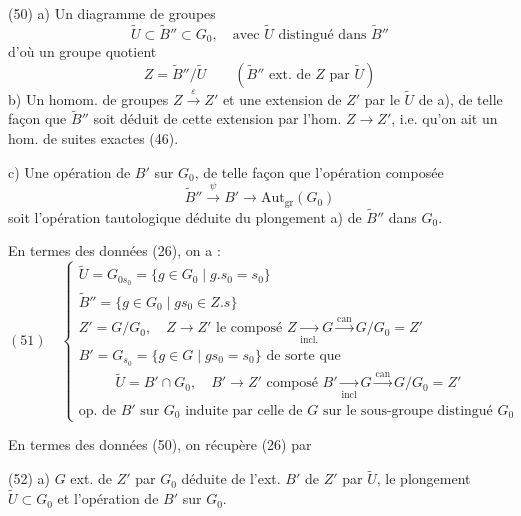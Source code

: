 \documentclass[11pt,a4paper]{article}
\begin{document}
(50) a) Un diagramme de groupes
\[
\tilde{U}\subset\tilde{B}''\subset G_0,\quad\text{avec } \tilde{U} \text{ distingué dans } \tilde{B}''
\]
\struck{\ill{}} d'où un groupe quotient
\[
Z=\tilde{B}''/\tilde{U}\qquad(\tilde{B}'' \text{ ext. de } Z \text{ par } \tilde{U})
\]
b) Un  homom. de groupes $Z\xrightarrow{\ \varepsilon\ }Z'$ et une extension  de $Z'$ par le $\tilde{U}$ de a), de telle façon que $\tilde{B}''$ soit déduit de cette extension par l'hom. $Z\to Z'$, i.e. qu'on ait un hom. de suites exactes (46).

c) Une opération de $B'$ sur $G_0$, de telle façon que l'opération composée
\[
\tilde{B}''\xrightarrow{\ \psi\ }B'\longrightarrow\mathrm{Aut}_{\mathrm{gr}}(G_0)
\]
soit l'opération tautologique déduite du plongement a) de $\tilde{B}''$ dans $G_0$.


En termes des données (26), on a :
\[
(51)\quad\left\{
\begin{array}{l}
\tilde{U}=G_{0s_0}=\{g\in G_0\mid g.s_0=s_0\}\\
\tilde{B}''=\{g\in G_0\mid gs_0\in Z.s\}\\
Z'=G/G_0,\quad Z\to Z' \text{ le composé } Z\xrightarrow[\text{incl.}]{}G\xrightarrow{\text{can}}G/G_0=Z'\\
B'=G_{s_0}=\{g\in G\mid gs_0=s_0\} \text{ de sorte que}\\
\phantom{B'=}\ \tilde{U}=B'\cap G_0,\quad B'\to Z' \text{ composé } B'\xrightarrow[\text{incl}]{}G\xrightarrow{\text{can}}G/G_0=Z'\\
\text{op. de } B' \text{ sur } G_0 \text{ induite par celle de } G \text{ sur le sous-groupe distingué } G_0
\end{array}\right.
\]

En termes des données (50), on récupère (26) par

(52) a) $G$ ext. de $Z'$ par $G_0$ déduite de  l'ext. $B'$ de $Z'$ par $\tilde{U}$, le plongement $\tilde{U}\subset G_0$ et l'opération  de $B'$ sur $G_0$.
\end{document}
